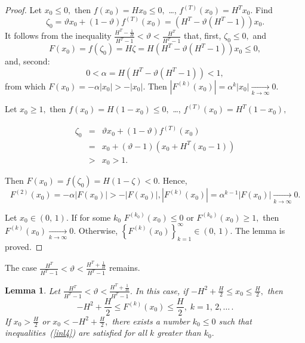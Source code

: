 \documentclass[12pt,a4paper]{amsart}
\newtheorem{lemma}{Lemma}
\begin{document}
\begin{proof}
Let $x_0\leq 0,$ then $f(x_0)=Hx_0\leq 0,$ \ldots, $f^{(T)}(x_0)=H^T x_0.$ Find 
$$
\zeta_0 =\vartheta x_0 + (1-\vartheta)f^{(T)}(x_0)=\left(H^T - \vartheta (H^T - 1)\right)x_0.
$$
It follows from the inequality $\frac{H^T-\frac{1}{H}}{H^T-1}<\vartheta<\frac{H^T}{H^T-1}$ that, first, $\zeta_0\leq 0,$ 
and 
$$F(x_0)=f(\zeta_0)=H\zeta=H\left(H^T - \vartheta (H^T - 1)\right)x_0\leq 0,$$ and, second: 
$$0<\alpha = H\left(H^T - \vartheta (H^T - 1)\right)<1,$$ from which $F(x_0)=-\alpha|x_0|>-|x_0|.$ Then 
$\left|F^{(k)}(x_0)\right|=\alpha^k |x_0|\xrightarrow[k\rightarrow\infty]{}0.$

Let $x_0\geq 1,$ then $f(x_0)=H(1-x_0)\leq 0,$ \ldots, $f^{(T)}(x_0)=H^T (1-x_0),$

\begin{eqnarray*}
\zeta_0&=&\vartheta x_0 + (1-\vartheta)f^{(T)}(x_0)
\\&=&x_0+(\vartheta-1)\left(x_0 + H^T (x_0-1)\right)\\
&>&x_0>1.
\end{eqnarray*}

Then $F(x_0)=f(\zeta_0)=H(1-\zeta) < 0.$ Hence, $$F^{(2)}(x_0)=-\alpha\left|F(x_0)\right|>-\left|F(x_0)\right|, \left|F^{(k)}(x_0)\right|=\alpha^{k-1} \left|F(x_0)\right| \xrightarrow[k\rightarrow\infty]{}0.$$


Let $x_0\in(0,\,1).$ If for some $k_0$ $F^{(k_0)}(x_0)\leq 0$ or $F^{(k_0)}(x_0)\geq 1,$ then 
$F^{(k)}(x_0)\xrightarrow[k\rightarrow\infty]{}0.$ Otherwise, $\left\{F^{(k)}(x_0)\right\}_{k=1}^{\infty}\in(0,\,1).$
The lemma is proved. 
\end{proof}

The case $\frac{H^T}{H^T-1}<\vartheta<\frac{H^T+\frac{1}{H}}{H^T-1}$ remains.

\begin{lemma}\label{l4}
Let $\frac{H^T}{H^T-1}<\vartheta<\frac{H^T+\frac{1}{H}}{H^T-1}.$ In this case, if $-H^2+\frac{H}{2}\leq x_0 \leq \frac{H}{2},$ 
then
\begin{equation}\label{inl4}
-H^2+\frac{H}{2}\leq F^{(k)}(x_0) \leq \frac{H}{2},\;k=1,\,2,\ldots\,.
\end{equation}
If $x_0>\frac{H}{2}$ or $x_0<-H^2+\frac{H}{2},$ there exists a number $k_0\leq 0$ such that inequalities~(\ref{inl4}) are satisfied 
for all $k$ greater than $k_0.$ 
\end{lemma}
\end{document}
